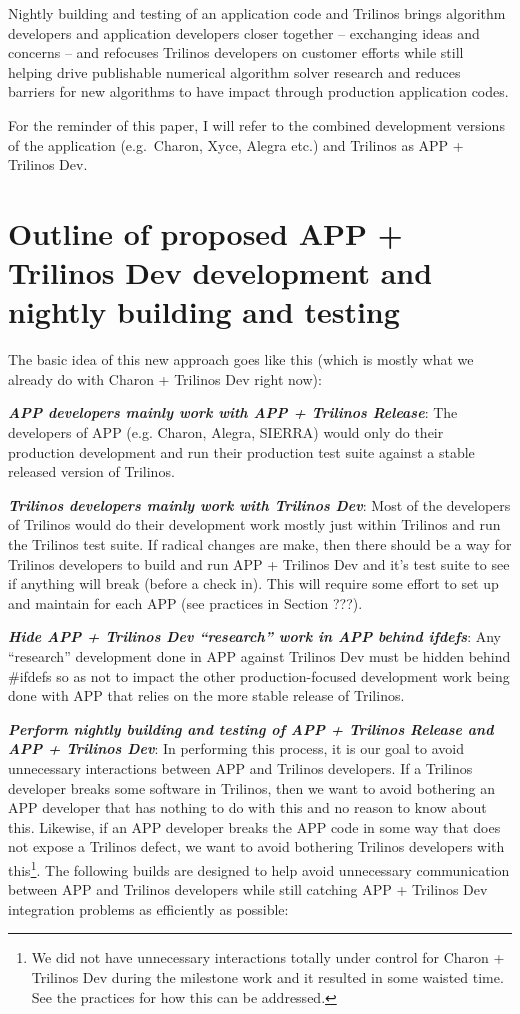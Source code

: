 \documentclass[pdf,ps2pdf,11pt]{SANDreport}
\begin{document}
Nightly building and testing of an application code and Trilinos
brings algorithm developers and application developers closer together --
exchanging ideas and concerns -- and refocuses Trilinos developers on customer 
efforts while still helping drive publishable numerical algorithm solver
research and reduces barriers for new algorithms to have impact through
production application codes.

For the reminder of this paper, I will refer to the combined development
versions of the application (e.g.\ Charon, Xyce, Alegra etc.) and Trilinos as
APP + Trilinos Dev.


%
{}\section{Outline of proposed APP + Trilinos Dev development and nightly
building and testing}
%

The basic idea of this new approach goes like this (which is mostly what we
already do with Charon + Trilinos Dev right now):

{}\textit{\textbf{APP developers mainly work with APP + Trilinos Release}}:
The developers of APP (e.g. Charon, Alegra, SIERRA) would only do their
production development and run their production test suite against a stable
released version of Trilinos.

{}\textit{\textbf{Trilinos developers mainly work with Trilinos Dev}}: Most of
the developers of Trilinos would do their development work mostly just within
Trilinos and run the Trilinos test suite.  If radical changes are make, then
there should be a way for Trilinos developers to build and run APP + Trilinos
Dev and it's test suite to see if anything will break (before a check in).
This will require some effort to set up and maintain for each APP (see
practices in Section ???).

{}\textit{\textbf{Hide APP + Trilinos Dev ``research'' work in APP behind
ifdefs}}: Any ``research'' development done in APP against Trilinos Dev must
be hidden behind {}\#ifdefs so as not to impact the other production-focused
development work being done with APP that relies on the more stable release of
Trilinos.

{}\textit{\textbf{Perform nightly building and testing of APP + Trilinos
Release and APP + Trilinos Dev}}: In performing this process, it is our goal
to avoid unnecessary interactions between APP and Trilinos developers.  If a
Trilinos developer breaks some software in Trilinos, then we want to avoid
bothering an APP developer that has nothing to do with this and no reason to
know about this.  Likewise, if an APP developer breaks the APP code in some
way that does not expose a Trilinos defect, we want to avoid bothering
Trilinos developers with this\footnote{We did not have unnecessary
interactions totally under control for Charon + Trilinos Dev during the
milestone work and it resulted in some waisted time.  See the practices for
how this can be addressed.}.  The following builds are designed to help avoid
unnecessary communication between APP and Trilinos developers while still
catching APP + Trilinos Dev integration problems as efficiently as possible:
\end{document}
